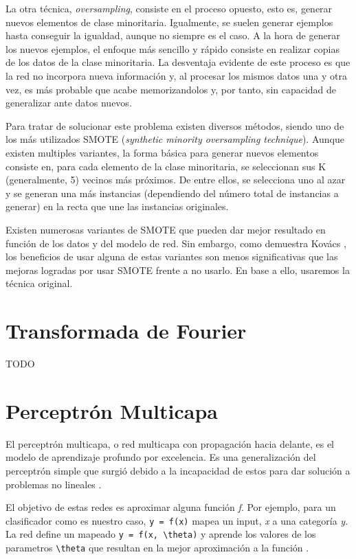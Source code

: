 La otra técnica, \textit{oversampling}, consiste en el proceso opuesto, esto es, generar nuevos elementos de clase minoritaria. Igualmente, se suelen generar ejemplos hasta conseguir la igualdad, aunque no siempre es el caso. A la hora de generar los nuevos ejemplos, el enfoque más sencillo y rápido consiste en realizar copias de los datos de la clase minoritaria. La desventaja evidente de este proceso es que la red no incorpora nueva información y, al procesar los mismos datos una y otra vez, es más probable que acabe memorizandolos y, por tanto, sin capacidad de generalizar ante datos nuevos.

Para tratar de solucionar este problema existen diversos métodos, siendo uno de los más utilizados SMOTE \cite{SMOTE} (\textit{synthetic minority oversampling technique}). Aunque existen multiples variantes, la forma básica para generar nuevos elementos consiste en, para cada elemento de la clase minoritaria, se seleccionan sus K (generalmente, 5) vecinos más próximos. De entre ellos, se selecciona uno al azar y se generan una más instancias (dependiendo del número total de instancias a generar) en la recta que une las instancias originales.

Existen numerosas variantes de SMOTE que pueden dar mejor resultado en función de los datos y del modelo de red. Sin embargo, como demuestra Kovács \cite{SMOTE-comparison}, los beneficios de usar alguna de estas variantes son menos significativas que las mejoras logradas por usar SMOTE frente a no usarlo. En base a ello, usaremos la técnica original.

\section{Transformada de Fourier}
TODO

\section{Perceptrón Multicapa}\label{sec:perceptron-multicapa}

El perceptrón multicapa, o red multicapa con propagación hacia delante,
es el modelo de aprendizaje profundo por excelencia. Es una
generalización del perceptrón simple que surgió debido a la incapacidad
de estos para dar solución a problemas no lineales \cite{Minsky-1969}.

El objetivo de estas redes es aproximar alguna función \emph{f}. Por
ejemplo, para un clasificador como es nuestro caso,
\texttt{y = f(x)} mapea un input, \emph{x} a una categoría \emph{y}.
La red define un mapeado \texttt{y = f(x, \textbackslash{}theta)} y
aprende los valores de los parametros \texttt{\textbackslash{}theta}
que resultan en la mejor aproximación a la función \cite{Goodfellow-et-al-2016}.

